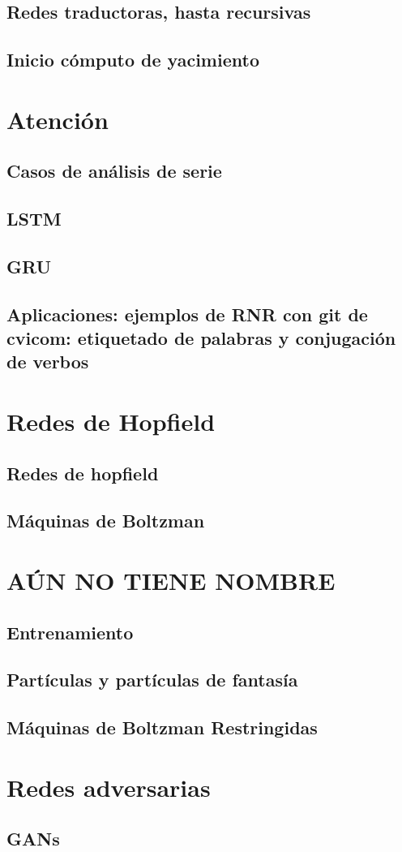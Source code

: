 \documentclass{article}
\begin{document}
\subsection{Redes traductoras, hasta recursivas}
\subsection{Inicio cómputo de yacimiento} %
\section{Atención}%
\subsection{Casos de análisis de serie}
\subsection{LSTM}
\subsection{GRU}
\subsection{Aplicaciones: ejemplos de RNR con git de cvicom: etiquetado de palabras y conjugación de verbos}
\section{Redes de Hopfield}%
\subsection{Redes de hopfield}
\subsection{Máquinas de Boltzman}

\newpage
\section{AÚN NO TIENE NOMBRE}%
\subsection{Entrenamiento}
\subsection{Partículas y partículas de fantasía}
\subsection{Máquinas de Boltzman Restringidas}
\section{Redes adversarias}%
\subsection{GANs}
\end{document}

